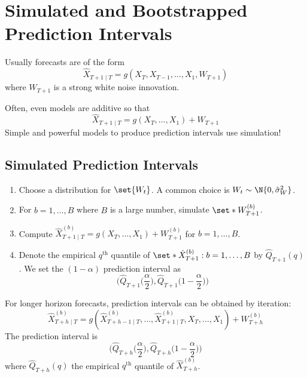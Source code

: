 \section{Simulated and Bootstrapped Prediction Intervals}
Usually forecasts are of the form
\[ \hat{X}_{T+1\mid T}=g(X_T,X_{T-1},\ldots,X_1,W_{T+1}) \]
where $ W_{T+1} $ is a strong white noise innovation.

Often, even models are additive so that
\[ \hat{X}_{T+1\mid T}=g(X_T,\ldots,X_1)+W_{T+1} \]
Simple and powerful models to produce prediction intervals
use simulation!
\subsection*{Simulated Prediction Intervals}
\begin{enumerate}[(1)]
      \item Choose a distribution for $ \set{W_t} $. A common choice is $ W_t \sim \N{0,\hat{\sigma}_W^2} $.
      \item For $ b=1,\ldots,B $ where $ B $ is a large number, simulate $ \set*{W_{T+1}^{(b)}} $.
      \item Compute $ \hat{X}_{T+1\mid T}^{(b)}=g(X_{T},\ldots,X_1)+W_{T+1}^{(b)} $
            for $ b=1,\ldots,B $.
      \item Denote the empirical $ q^{\text{th}} $ quantile of $ \set*{\hat{X}_{T+1}^{(b)}:b=1,\ldots,B} $
            by $ \hat{Q}_{T+1}(q) $. We set the $ (1-\alpha) $ prediction interval as
            \[ \biggl(\hat{Q}_{T+1}\biggl(\frac{\alpha}{2} \biggr),\hat{Q}_{T+1}\biggl(1-\frac{\alpha}{2} \biggr)\biggr) \]
\end{enumerate}
\begin{Remark}{}{}
      For longer horizon forecasts, prediction intervals can be obtained by iteration:
      \[ \hat{X}_{T+h\mid T}^{(b)}=g(\hat{X}_{T+h-1\mid T}^{(b)},\ldots,\hat{X}_{T+1\mid T}^{(b)},X_T,\ldots,X_1)+W_{T+h}^{(b)} \]
      The prediction interval is
      \[ \biggl(\hat{Q}_{T+h}\biggl(\frac{\alpha}{2} \biggr),\hat{Q}_{T+h}\biggl(1-\frac{\alpha}{2} \biggr)\biggr) \]
      where $ \hat{Q}_{T+h}(q) $ the empirical $ q^{\text{th}} $ quantile of $ \hat{X}_{T+h}^{(b)} $.
\end{Remark}
